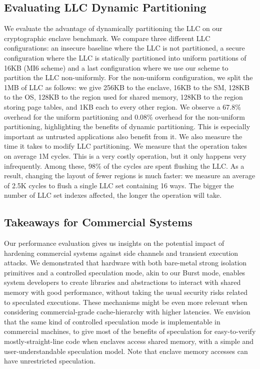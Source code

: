 \subsection{Evaluating LLC Dynamic Partitioning}
\label{sec:evalllcpartitioning}

We evaluate the advantage of dynamically partitioning the LLC on our cryptographic enclave benchmark.
We compare three different LLC configurations:
an insecure baseline where the LLC is not partitioned, a secure configuration where the LLC is statically partitioned into uniform partitions of 16KB (MI6 scheme) and a last configuration where we use our scheme to partition the LLC non-uniformly.
For the non-uniform configuration, we split the 1MB of LLC as follows: we give 256KB to the enclave, 16KB to the SM, 128KB to the OS, 128KB to the region used for shared memory, 128KB to the region storing page tables, and 1KB each to every other region.
We observe a 67.8\% overhead for the uniform partitioning and 0.08\% overhead for the non-uniform partitioning, highlighting the benefits of dynamic partitioning.
This is especially important as untrusted applications also benefit from it.
We also measure the time it takes to modify LLC partitioning.
We measure that the operation takes on average 1M cycles.
This is a very costly operation, but it only happens very infrequently.
Among these, 98\% of the cycles are spent flushing the LLC.
As a result, changing the layout of fewer regions is much faster: we measure an average of 2.5K cycles to flush a single LLC set containing 16 ways. 
The bigger the number of LLC set indexes affected, the longer the operation will take.

\subsection{Takeaways for Commercial Systems}
Our performance evaluation gives us insights on the potential impact of hardening commercial systems against side channels and transient execution attacks.
We demonstrated that hardware with both bare-metal strong isolation primitives and a controlled speculation mode, akin to our Burst mode, enables system developers to create libraries and abstractions to interact with shared memory with good performance, without taking the usual security risks related to speculated executions.
These mechanisms might be even more relevant when considering commercial-grade cache-hierarchy with higher latencies.
We envision that the same kind of controlled speculation mode is implementable in commercial machines, to give most of the benefits of speculation for easy-to-verify mostly-straight-line code when enclaves access shared memory, with a simple and user-understandable speculation model. Note that enclave memory accesses can have unrestricted speculation.

